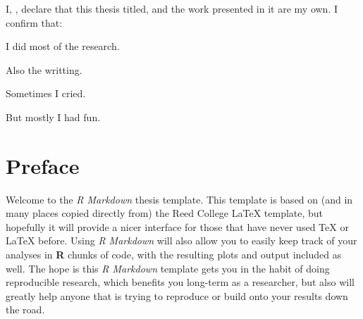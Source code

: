 \documentclass[
11pt, %
oneside, %
english, %
singlespacing, %
]{macthesis} %
\begin{document}

\begin{declaration}
\addchaptertocentry{\authorshipname}

\noindent I, \authorname, declare that this thesis titled, \emph{\ttitle} and the work presented in it are my own. I confirm that:

I did most of the research.

Also the writting.

Sometimes I cried.

But mostly I had fun.

\end{declaration}


\label{lastoffront}
\clearpage


\mainmatter %
\pagestyle{thesis}
\chapter*{Preface}\label{preface}

Welcome to the \emph{R Markdown} thesis template. This template is based on (and in many places copied directly from) the Reed College LaTeX template, but hopefully it will provide a nicer interface for those that have never used TeX or LaTeX before. Using \emph{R Markdown} will also allow you to easily keep track of your analyses in \textbf{R} chunks of code, with the resulting plots and output included as well. The hope is this \emph{R Markdown} template gets you in the habit of doing reproducible research, which benefits you long-term as a researcher, but also will greatly help anyone that is trying to reproduce or build onto your results down the road.
\end{document}
